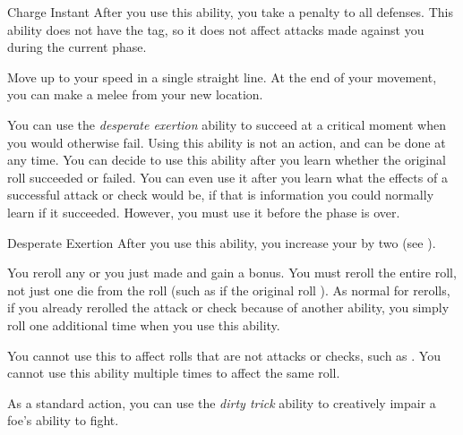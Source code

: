         \begin{instantability}{Charge}
            \label{Charge}
            Instant
            \rankline
            After you use this ability, you  take a  penalty to all defenses.
            This ability does not have the  tag, so it does not affect attacks made against you during the current phase.

            Move up to your speed in a single straight line.
            At the end of your movement, you can make a melee  from your new location.
        \end{instantability}

        \label{Desperate Exertion} You can use the \textit{desperate exertion} ability to succeed at a critical moment when you would otherwise fail.
        Using this ability is not an action, and can be done at any time.
        You can decide to use this ability after you learn whether the original roll succeeded or failed.
        You can even use it after you learn what the effects of a successful attack or check would be, if that is information you could normally learn if it succeeded.
        However, you must use it before the phase is over.

        \begin{instantability}{Desperate Exertion}
            \label{Desperate Exertion}
            \rankline
            After you use this ability, you increase your  by two (see ).

            You reroll any  or  you just made and gain a  bonus.
            You must reroll the entire roll, not just one die from the roll (such as if the original roll ).
            As normal for rerolls, if you already rerolled the attack or check because of another ability, you simply roll one additional time when you use this ability.

            You cannot use this to affect rolls that are not attacks or checks, such as .
            You cannot use this ability multiple times to affect the same roll.
        \end{instantability}

         As a standard action, you can use the \textit{dirty trick} ability to creatively impair a foe's ability to fight.

